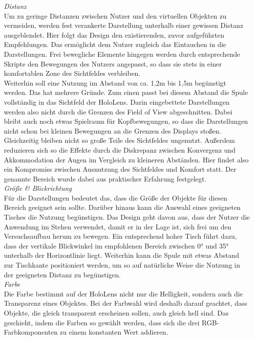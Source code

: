 \textit{Distanz}\\
Um zu geringe Distanzen zwischen Nutzer und den virtuellen Objekten zu vermeiden, werden fest verankerte Darstellung unterhalb einer gewissen Distanz ausgeblendet. Hier folgt das Design den existierenden, zuvor aufgeführten Empfehlungen. Das ermöglicht dem Nutzer zugleich das Eintauchen in die Darstellungen. Frei bewegliche Elemente hingegen werden durch entsprechende Skripte den Bewegungen des Nutzers angepasst, so dass sie stets in einer komfortablen Zone des Sichtfeldes verbleiben.\\

Weiterhin soll eine Nutzung im Abstand von ca. 1,2m bis 1,5m begünstigt werden. Das hat mehrere Gründe. Zum einen passt bei diesem Abstand die Spule vollständig in das Sichtfeld der HoloLens. Darin eingebettete Darstellungen werden also nicht durch die Grenzen des Field of View abgeschnitten. Dabei bleibt auch noch etwas Spielraum für Kopfbewegungen, so dass die Darstellungen nicht schon bei kleinen Bewegungen an die Grenzen des Displays stoßen. Gleichzeitig bleiben nicht so große Teile des Sichtfeldes ungenutzt. Außerdem reduzieren sich so die Effekte durch die Diskrepanz zwischen Konvergenz und Akkommodation der Augen im Vergleich zu kleineren Abständen. Hier findet also ein Kompromiss zwischen Ausnutzung des Sichtfeldes und Komfort statt. Der genannte Bereich wurde dabei aus praktischer Erfahrung festgelegt.\\

\textit{Größe \& Blickrichtung}\\
Für die Darstellungen bedeutet das, dass die Größe der Objekte für diesen Bereich geeignet sein sollte. Darüber hinaus kann die Auswahl eines geeigneten Tisches die Nutzung begünstigen. Das Design geht davon aus, dass der Nutzer die Anwendung im Stehen verwendet, damit er in der Lage ist, sich frei um den Versuchsaufbau herum zu bewegen. Ein entsprechend hoher Tisch führt dazu, dass der vertikale Blickwinkel im empfohlenen Bereich zwischen 0° und 35° unterhalb der Horizontlinie liegt. Weiterhin kann die Spule mit etwas Abstand zur Tischkante positioniert werden, um so auf natürliche Weise die Nutzung in der geeigneten Distanz zu begünstigen.\\

\textit{Farbe}\\
Die Farbe bestimmt auf der HoloLens nicht nur die Helligkeit, sondern auch die Transparenz eines Objektes. Bei der Farbwahl wird deshalb darauf geachtet, dass Objekte, die gleich transparent erscheinen sollen, auch gleich hell sind. Das geschieht, indem die Farben so gewählt werden, dass sich die drei RGB-Farbkomponenten zu einem konstanten Wert addieren.\\

